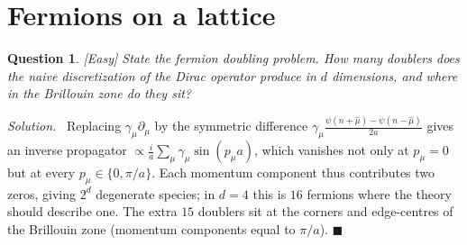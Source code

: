 \documentclass[11pt]{article}
\newcommand{\diff}[1]{\textcolor{blue!60!black}{\footnotesize\textsf{[#1]}}\quad}
\newtheorem{question}{Question}
\newenvironment{solution}{\par\smallskip\noindent\textit{Solution.}\ }{\hfill$\blacksquare$\par\smallskip}
\begin{document}
\section{Fermions on a lattice}

\begin{question}
\diff{Easy} State the fermion doubling problem. How many doublers does the naive discretization of the Dirac operator produce in $d$ dimensions, and where in the Brillouin zone do they sit?
\end{question}
\begin{solution}
Replacing $\gamma_\mu\partial_\mu$ by the symmetric difference $\gamma_\mu\frac{\psi(n+\hat\mu)-\psi(n-\hat\mu)}{2a}$ gives an inverse propagator $\propto \frac{i}{a}\sum_\mu \gamma_\mu \sin(p_\mu a)$, which vanishes not only at $p_\mu=0$ but at every $p_\mu \in \{0, \pi/a\}$. Each momentum component thus contributes two zeros, giving $2^d$ degenerate species; in $d=4$ this is $16$ fermions where the theory should describe one. The extra $15$ doublers sit at the corners and edge-centres of the Brillouin zone (momentum components equal to $\pi/a$).
\end{solution}
\end{document}
